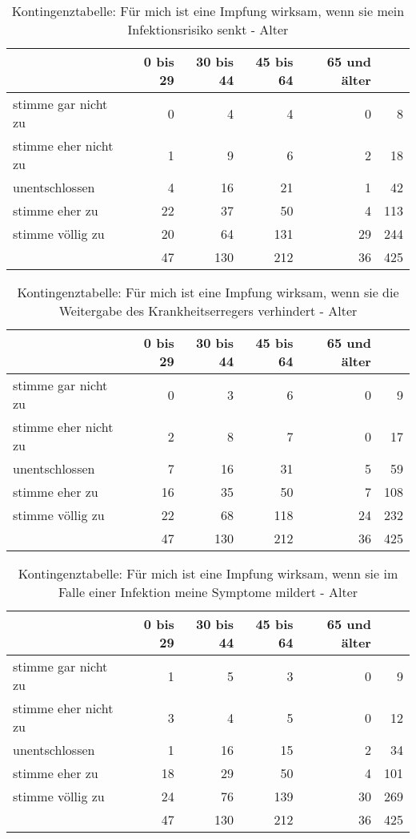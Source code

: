 \begin{table}[ht!]
    \centering
    \begin{tabular} {l | r r r r | r}
        & 0 bis 29 & 30 bis 44 & 45 bis 64 & 65 und älter & \\
        \hline
        stimme gar nicht zu & 0 & 4 & 4 & 0 & 8 \\
        stimme eher nicht zu & 1 & 9 & 6 & 2 & 18 \\
        unentschlossen & 4 & 16 & 21 & 1 & 42 \\
        stimme eher zu & 22 & 37 & 50 & 4 & 113 \\
        stimme völlig zu & 20 & 64 & 131 & 29 & 244 \\
        \hline
        & 47 & 130 & 212 & 36 & 425 \\
    \end{tabular}
    \caption{Kontingenztabelle: Für mich ist eine Impfung wirksam, wenn sie mein Infektionsrisiko senkt - Alter}
    \label{tab:chi_infektionsrisiko_alter}
\end{table}

\begin{table}[ht!]
    \centering
    \begin{tabular} {l | r r r r | r}
        & 0 bis 29 & 30 bis 44 & 45 bis 64 & 65 und älter & \\
        \hline
        stimme gar nicht zu & 0 & 3 & 6 & 0 & 9 \\
        stimme eher nicht zu & 2 & 8 & 7 & 0 & 17 \\
        unentschlossen & 7 & 16 & 31 & 5 & 59 \\
        stimme eher zu & 16 & 35 & 50 & 7 & 108 \\
        stimme völlig zu & 22 & 68 & 118 & 24 & 232 \\
        \hline
        & 47 & 130 & 212 & 36 & 425 \\
    \end{tabular}
    \caption{Kontingenztabelle: Für mich ist eine Impfung wirksam, wenn sie die Weitergabe des Krankheitserregers verhindert - Alter}
    \label{tab:chi_weitergabe_alter}
\end{table}

\begin{table}[ht!]
    \centering
    \begin{tabular} {l | r r r r | r}
        & 0 bis 29 & 30 bis 44 & 45 bis 64 & 65 und älter & \\
        \hline
        stimme gar nicht zu & 1 & 5 & 3 & 0 & 9 \\
        stimme eher nicht zu & 3 & 4 & 5 & 0 & 12 \\
        unentschlossen & 1 & 16 & 15 & 2 & 34 \\
        stimme eher zu & 18 & 29 & 50 & 4 & 101 \\
        stimme völlig zu & 24 & 76 & 139 & 30 & 269 \\
        \hline
        & 47 & 130 & 212 & 36 & 425
    \end{tabular}
    \caption{Kontingenztabelle: Für mich ist eine Impfung wirksam, wenn sie im Falle einer Infektion meine Symptome mildert - Alter}
    \label{tab:chi_symptome_alter}
\end{table}

